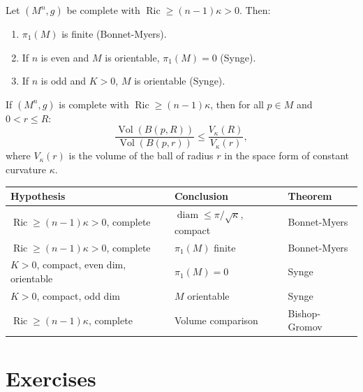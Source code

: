 \begin{proposition}
Let $(M^n, g)$ be complete with $\operatorname{Ric} \geq (n-1)\kappa > 0$. Then:
\begin{enumerate}
    \item $\pi_1(M)$ is finite (Bonnet-Myers).
    \item If $n$ is even and $M$ is orientable, $\pi_1(M) = 0$ (Synge).
    \item If $n$ is odd and $K > 0$, $M$ is orientable (Synge).
\end{enumerate}
\end{proposition}

\begin{theorem}
If $(M^n, g)$ is complete with $\operatorname{Ric} \geq (n-1)\kappa$, then for all
$p \in M$ and $0 < r \leq R$:
\[
    \frac{\operatorname{Vol}(B(p, R))}{\operatorname{Vol}(B(p, r))}
    \leq \frac{V_\kappa(R)}{V_\kappa(r)},
\]
where $V_\kappa(r)$ is the volume of the ball of radius $r$ in the space form of
constant curvature $\kappa$.
\end{theorem}

\begin{keyformulas}[title=\textbf{Summary of curvature and topology}]
\begin{center}
\renewcommand{\arraystretch}{1.3}
\begin{tabular}{lll}
\textbf{Hypothesis} & \textbf{Conclusion} & \textbf{Theorem} \\
\hline
$\operatorname{Ric} \geq (n-1)\kappa > 0$, complete
    & $\operatorname{diam} \leq \pi/\sqrt{\kappa}$, compact
    & Bonnet-Myers \\
$\operatorname{Ric} \geq (n-1)\kappa > 0$, complete
    & $\pi_1(M)$ finite
    & Bonnet-Myers \\
$K > 0$, compact, even dim, orientable
    & $\pi_1(M) = 0$
    & Synge \\
$K > 0$, compact, odd dim
    & $M$ orientable
    & Synge \\
$\operatorname{Ric} \geq (n-1)\kappa$, complete
    & Volume comparison
    & Bishop-Gromov \\
\end{tabular}
\end{center}
\end{keyformulas}

\section{Exercises}

